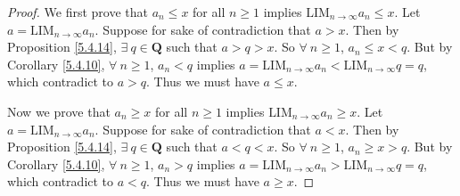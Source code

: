 \begin{proof}
    We first prove that \(a_n \leq x\) for all \(n \geq 1\) implies \(\text{LIM}_{n \to \infty} a_n \leq x\).
    Let \(a = \text{LIM}_{n \to \infty} a_n\).
    Suppose for sake of contradiction that \(a > x\).
    Then by Proposition \ref{5.4.14}, \(\exists\ q \in \mathbf{Q}\) such that \(a > q > x\).
    So \(\forall\ n \geq 1\), \(a_n \leq x < q\).
    But by Corollary \ref{5.4.10}, \(\forall\ n \geq 1\), \(a_n < q\) implies \(a = \text{LIM}_{n \to \infty} a_n < \text{LIM}_{n \to \infty} q = q\), which contradict to \(a > q\).
    Thus we must have \(a \leq x\).

    Now we prove that \(a_n \geq x\) for all \(n \geq 1\) implies \(\text{LIM}_{n \to \infty} a_n \geq x\).
    Let \(a = \text{LIM}_{n \to \infty} a_n\).
    Suppose for sake of contradiction that \(a < x\).
    Then by Proposition \ref{5.4.14}, \(\exists\ q \in \mathbf{Q}\) such that \(a < q < x\).
    So \(\forall\ n \geq 1\), \(a_n \geq x > q\).
    But by Corollary \ref{5.4.10}, \(\forall\ n \geq 1\), \(a_n > q\) implies \(a = \text{LIM}_{n \to \infty} a_n > \text{LIM}_{n \to \infty} q = q\), which contradict to \(a < q\).
    Thus we must have \(a \geq x\).
\end{proof}